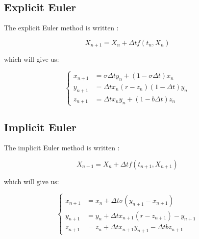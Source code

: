 \documentclass[12pt]{article}
\begin{document}
	\subsection{Explicit Euler}
	
	The explicit Euler method is written :
	
	$$X_{n+1}=X_n+\Delta t f(t_n,X_n)$$
	
	\noindent which will give us:
	
	$$\left\{\begin{aligned} 
		x_{n+1}&=\sigma\Delta t y_n+(1-\sigma\Delta t) x_n \\
		y_{n+1}&=\Delta t x_n(r-z_n)(1-\Delta t)y_n \\
		z_{n+1}&=\Delta t x_ny_n+(1-b\Delta t)z_n
	\end{aligned}\right.$$
	
	\subsection{Implicit Euler}
	
	The implicit Euler method is written :
	
	$$X_{n+1}=X_n+\Delta t f(t_{n+1},X_{n+1})$$
	
	\noindent which will give us:
	
	$$\left\{\begin{aligned} 
		x_{n+1}&=x_n+\Delta t\sigma(y_{n+1}-x_{n+1}) \\
		y_{n+1}&=y_n+\Delta t x_{n+1}(r-z_{n+1})-y_{n+1} \\
		z_{n+1}&=z_n+\Delta tx_{n+1}y_{n+1}-\Delta tbz_{n+1}
	\end{aligned}\right.$$
	
\end{document}
